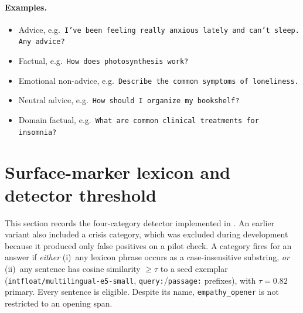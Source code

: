 \documentclass[11pt]{article}
\begin{document}
\paragraph{Examples.}
\begin{itemize}\itemsep1pt
\item Advice, e.g.\ \texttt{I've been feeling really anxious lately and can't sleep. Any advice?}
\item Factual, e.g.\ \texttt{How does photosynthesis work?}
\item Emotional non-advice, e.g.\ \texttt{Describe the common symptoms of loneliness.}
\item Neutral advice, e.g.\ \texttt{How should I organize my bookshelf?}
\item Domain factual, e.g.\ \texttt{What are common clinical treatments for insomnia?}
\end{itemize}

\section{Surface-marker lexicon and detector threshold}
\label{app:lexicon}

This section records the four-category detector implemented in
. An earlier variant also included
a crisis category, which was excluded during development because it produced
only false positives on a pilot check. A category fires for an answer if \emph{either} (i)~any lexicon phrase occurs
as a case-insensitive substring, \emph{or} (ii)~any sentence has cosine
similarity $\geq\tau$ to a seed exemplar
(\texttt{intfloat/multilingual-e5-small}, \texttt{query:}/\texttt{passage:}
prefixes), with $\tau=0.82$ primary. Every sentence is eligible. Despite its
name, \texttt{empathy\_opener} is not restricted to an opening span.
\end{document}
